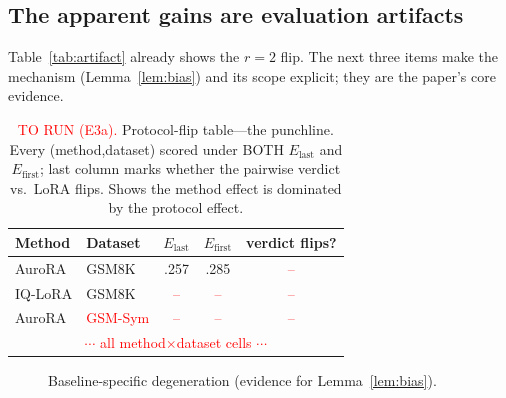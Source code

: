 \documentclass[preprint,11pt]{elsarticle}
\begin{document}
\subsection{The apparent gains are evaluation artifacts}
Table~\ref{tab:artifact} already shows the $r{=}2$ flip. The next three items make the mechanism (Lemma~\ref{lem:bias}) and
its scope explicit; they are the paper's core evidence.

\begin{table}[t]\centering
\caption{\textcolor{red}{TO RUN (E3a).} Protocol-flip table---the punchline. Every (method,dataset) scored under BOTH
$E_{\text{last}}$ and $E_{\text{first}}$; last column marks whether the pairwise verdict vs.\ LoRA flips. Shows the method
effect is dominated by the protocol effect.}
\label{tab:flip}
\begin{tabular}{llccc}
\toprule
Method & Dataset & $E_{\text{last}}$ & $E_{\text{first}}$ & verdict flips?\\
\midrule
AuroRA & GSM8K & .257 & .285 & \textcolor{red}{--}\\
IQ-LoRA & GSM8K & \textcolor{red}{--} & \textcolor{red}{--} & \textcolor{red}{--}\\
AuroRA & \textcolor{red}{GSM-Sym} & \textcolor{red}{--} & \textcolor{red}{--} & \textcolor{red}{--}\\
\multicolumn{5}{c}{\textcolor{red}{$\cdots$ all method$\times$dataset cells $\cdots$}}\\
\bottomrule
\end{tabular}
\end{table}

\begin{figure}[t]\centering
{}
\caption{Baseline-specific degeneration (evidence for Lemma~\ref{lem:bias}).}
\label{fig:nhash}
\end{figure}
\end{document}
